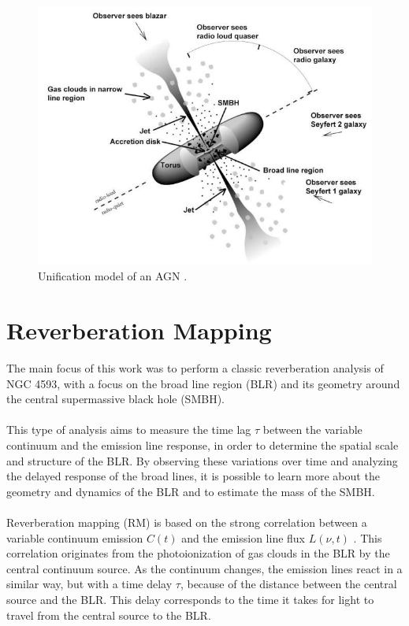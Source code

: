 \begin{figure}[!ht]
	\centering
	\includegraphics[width=\textwidth]{pictures/Chapter1/AGN_unified_model.jpg}
	\caption{Unification model of an AGN \parencite{fermi2025figure1}.}
	\label{fig:agn_sed}
\end{figure}



\section{Reverberation Mapping}



The main focus of this work was to perform a classic reverberation analysis of NGC 4593, with a focus on the broad line region (BLR) and its geometry around the central supermassive black hole (SMBH).\\\\
This type of analysis aims to measure the time lag $\tau$ between the variable continuum and the emission line response, in order to determine the spatial scale and structure of the BLR. By observing these variations over time and analyzing the delayed response of the broad lines, it is possible to learn more about the geometry and dynamics of the BLR and to estimate the mass of the SMBH.\\\\
Reverberation mapping (RM) is based on the strong correlation between a variable continuum emission $C(t)$ and the emission line flux $L(\nu, t)$ \parencite{horne2021space}. This correlation originates from the photoionization of gas clouds in the BLR by the central continuum source. As the continuum changes, the emission lines react in a similar way, but with a time delay $\tau$, because of the distance between the central source and the BLR. This delay corresponds to the time it takes for light to travel from the central source to the BLR.\\\\